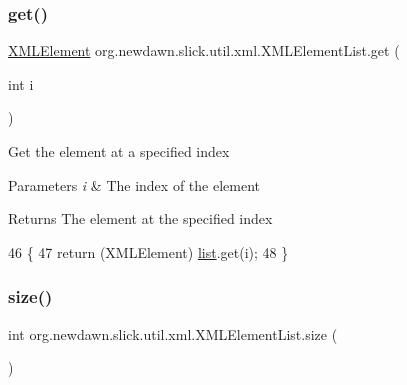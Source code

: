 \subsubsection{\texorpdfstring{get()}{get()}}
{\footnotesize\ttfamily \mbox{\hyperlink{classorg_1_1newdawn_1_1slick_1_1util_1_1xml_1_1_x_m_l_element}{X\+M\+L\+Element}} org.\+newdawn.\+slick.\+util.\+xml.\+X\+M\+L\+Element\+List.\+get (\begin{DoxyParamCaption}\item[{int}]{i }\end{DoxyParamCaption})\hspace{0.3cm}{\ttfamily [inline]}}

Get the element at a specified index


\begin{DoxyParams}{Parameters}
{\em i} & The index of the element \\
\hline
\end{DoxyParams}
\begin{DoxyReturn}{Returns}
The element at the specified index 
\end{DoxyReturn}

\begin{DoxyCode}
46                                  \{
47         \textcolor{keywordflow}{return} (XMLElement) \mbox{\hyperlink{classorg_1_1newdawn_1_1slick_1_1util_1_1xml_1_1_x_m_l_element_list_ade4a37ed92cf6392dbea3cdc9d9e6a6f}{list}}.get(i);
48     \}
\end{DoxyCode}
\mbox{\label{classorg_1_1newdawn_1_1slick_1_1util_1_1xml_1_1_x_m_l_element_list_a5232dae8d4165a26a1c17360b0591efc}} 
\subsubsection{\texorpdfstring{size()}{size()}}
{\footnotesize\ttfamily int org.\+newdawn.\+slick.\+util.\+xml.\+X\+M\+L\+Element\+List.\+size (\begin{DoxyParamCaption}{ }\end{DoxyParamCaption})\hspace{0.3cm}{\ttfamily [inline]}}

